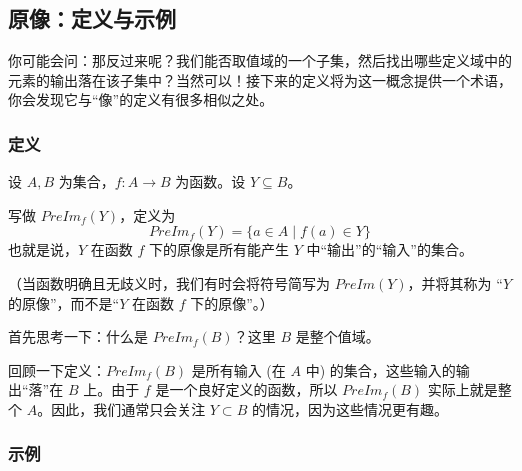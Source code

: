 
\subsection{原像：定义与示例}

你可能会问：那反过来呢？我们能否取值域的一个子集，然后找出哪些定义域中的元素的输出落在该子集中？当然可以！接下来的定义将为这一概念提供一个术语，你会发现它与``像''的定义有很多相似之处。

\subsubsection*{定义}

\begin{definition}
    设 $A, B$ 为集合，$f:A \to B$ 为函数。设 $Y \subseteq B$。

     写做 $PreIm_f(Y)$，定义为
    \[PreIm_f (Y) = \{a \in A \mid f(a) \in Y \}\]
    也就是说，$Y$ 在函数 $f$ 下的原像是所有能产生 $Y$ 中``输出''的``输入''的集合。

    （当函数明确且无歧义时，我们有时会将符号简写为 $PreIm(Y)$，并将其称为 ``$Y$ 的原像''，而不是``$Y$ 在函数 $f$ 下的原像''。）
\end{definition}

首先思考一下：什么是 $PreIm_f (B)$？这里 $B$ 是整个值域。

回顾一下定义：$PreIm_f (B)$ 是所有输入 (在 $A$ 中) 的集合，这些输入的输出``落''在 $B$ 上。由于 $f$ 是一个良好定义的函数，所以 $PreIm_f (B)$ 实际上就是整个 $A$。因此，我们通常只会关注 $Y \subset B$ 的情况，因为这些情况更有趣。

\subsubsection*{示例}

